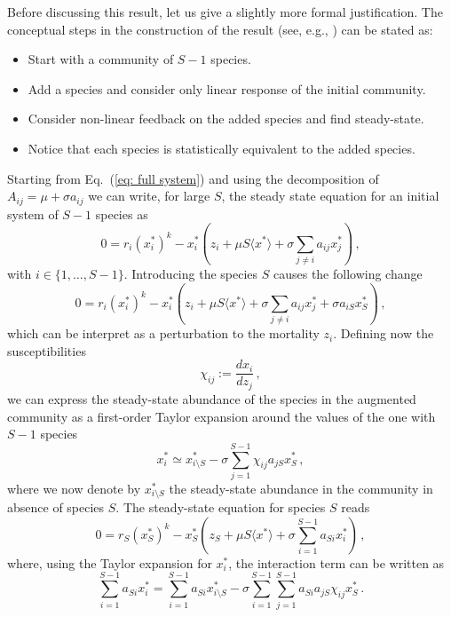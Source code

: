 \documentclass[10pt]{article}
\begin{document}
Before discussing this result, let us give a slightly more formal justification.
The conceptual steps in the construction of the result (see, e.g., \cite{Barbier17}) can be stated as:
\begin{itemize}
    \item Start with a community of $S-1$ species.
    \item Add a species and consider only linear response of the initial community.
    \item Consider non-linear feedback on the added species and find steady-state.
    \item Notice that each species is statistically equivalent to the added species.
\end{itemize}
Starting from Eq.~(\ref{eq: full system}) and using the decomposition 
of $A_{ij}=\mu+\sigma a_{ij}$ we can write, for large $S$,
the steady state equation for an initial system of $S-1$ species as
\begin{equation}
    0 = r_i(x_i^*)^k - x_i^*\left(z_i + \mu S\langle x^* \rangle + \sigma\sum_{j\neq i}a_{ij}x_j^*\right)\, ,
\end{equation}
with $i \in \{1,\dots, S-1\}$. Introducing the species $S$
causes the following change
\begin{equation}
    0 = r_i(x_i^*)^k - x_i^*\left(z_i + \mu S\langle x^* \rangle + \sigma\sum_{j\neq i}a_{ij}x_j^* +\sigma a_{iS}x_S^*\right)\, ,
\end{equation}
which can be interpret as a perturbation to the mortality $z_i$.
Defining now the susceptibilities
\begin{equation}
    \chi_{ij} := \frac{dx_i}{dz_j} \, ,
\end{equation}
we can express the steady-state abundance of the species in the augmented
community as a first-order Taylor expansion around the values of the one
with $S-1$ species
\begin{equation}
    x_i^* \simeq x_{i \setminus S}^* - \sigma\sum_{j=1}^{S-1}\chi_{ij}a_{jS}x_S^*\, ,
\end{equation}
where we now denote by $x_{i \setminus S}^*$ the steady-state abundance
in the community in absence of species $S$.
The steady-state equation for species $S$ reads
\begin{equation}
    0 = r_S(x_S^*)^k - x_S^*\left(z_S + \mu S\langle x^* \rangle + \sigma\sum_{i=1}^{S-1}a_{Si}x_i^*\right)\, ,
\end{equation}
where, using the Taylor expansion for $x_i^*$, the interaction term can be written as
\begin{equation}
    \sum_{i=1}^{S-1}a_{Si}x_i^* = \sum_{i=1}^{S-1}a_{Si}x_{i\setminus S}^* - 
    \sigma\sum_{i=1}^{S-1}\sum_{j=1}^{S-1}a_{Si}a_{jS}\chi_{ij}x_S^* \, .
\end{equation}
\end{document}
